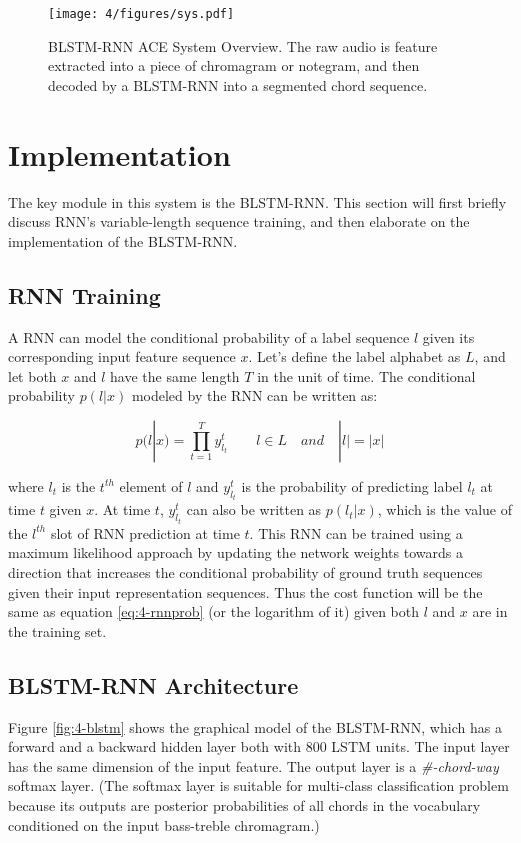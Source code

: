 \begin{figure}[htb]
\centering
\texttt{[image: 4/figures/sys.pdf]}
\caption{BLSTM-RNN ACE System Overview. The raw audio is feature extracted into a piece of chromagram or notegram, and then decoded by a BLSTM-RNN into a segmented chord sequence.}
\label{fig:4-sysover}
\end{figure}

\section{Implementation}\label{sec:4-blstm}
The key module in this system is the BLSTM-RNN. This section will first briefly discuss RNN's variable-length sequence training, and then elaborate on the implementation of the BLSTM-RNN.

\subsection{RNN Training}
A RNN can model the conditional probability of a label sequence $l$ given its corresponding input feature sequence $x$. Let's define the label alphabet as $L$, and let both $x$ and $l$ have the same length $T$ in the unit of time. The conditional probability $p(l|x)$ modeled by the RNN can be written as:

\begin{equation}\label{eq:4-rnnprob}
	p(l|x) = \prod_{t=1}^T y_{l_t}^t  \quad\quad l\in L \quad and \quad |l| = |x|
\end{equation}

where $l_t$ is the $t^{th}$ element of $l$ and $y_{l_t}^t$ is the probability of predicting label $l_t$ at time $t$ given $x$. At time $t$, $y_{l_t}^t$ can also be written as $p(l_t|x)$, which is the value of the $l^{th}$ slot of RNN prediction at time $t$. This RNN can be trained using a maximum likelihood approach by updating the network weights towards a direction that increases the conditional probability of ground truth sequences given their input representation sequences. Thus the cost function will be the same as equation \ref{eq:4-rnnprob} (or the logarithm of it) given both $l$ and $x$ are in the training set.

\subsection{BLSTM-RNN Architecture} \label{sec:blstmrnnarch}
Figure \ref{fig:4-blstm} shows the graphical model of the BLSTM-RNN, which has a forward and a backward hidden layer both with 800 LSTM units. The input layer has the same dimension of the input feature. The output layer is a \textit{\#-chord-way} softmax layer. (The softmax layer is suitable for multi-class classification problem because its outputs are posterior probabilities of all chords in the vocabulary conditioned on the input bass-treble chromagram.)

